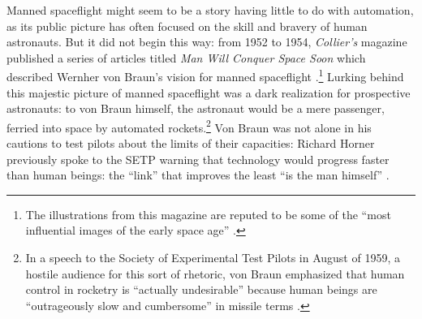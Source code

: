 Manned spaceflight might seem to be a story having little to do with
automation, as its public picture has often focused on the skill and
bravery of human astronauts. But it did not begin this way: from 1952
to 1954, \emph{Collier's} 
magazine published a series of articles 
titled \emph{Man Will Conquer Space Soon} which described Wernher von
Braun's vision for manned spaceflight \cite{scribdColliers}
\cite{dreamsofspace}.\footnote{The illustrations from this magazine
  are reputed to be some of the ``most influential images of the early
space age'' \cite[p. 9]{marketingMoon}.} Lurking behind this majestic
picture of manned spaceflight was a dark 
realization for prospective astronauts: to von Braun himself, the
astronaut would be a mere passenger, ferried into space by automated
rockets.\footnote{In a speech to the Society of Experimental Test Pilots in
August of 1959, a hostile audience for this sort of rhetoric, von
Braun emphasized that human control in rocketry is ``actually
undesirable'' because human beings are ``outrageously slow and
cumbersome'' in missile terms \cite[p. 66-67]{DM}.} Von Braun
was not alone in his cautions to
test pilots about the limits of their capacities: Richard Horner
previously spoke to the SETP warning that technology would progress
faster than human beings: the ``link'' that improves the least ``is
the man himself'' \cite[p. 19]{DM}. 



